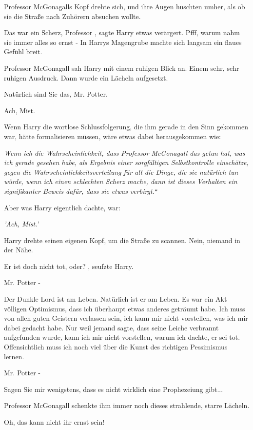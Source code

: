 Professor McGonagalls Kopf drehte sich, und ihre Augen huschten umher, als ob
sie die Straße nach Zuhörern absuchen wollte.

\glqq Das war ein Scherz, Professor\grqq{} , sagte Harry etwas verärgert. Pfff,
warum nahm sie immer alles so ernst - In Harrys Magengrube machte sich
langsam ein flaues Gefühl breit.

Professor McGonagall sah Harry mit einem ruhigen Blick an. Einem sehr, sehr
ruhigen Ausdruck. Dann wurde ein Lächeln aufgesetzt.

\glqq Natürlich sind Sie das, Mr. Potter.\grqq{}

Ach, Mist.

Wenn Harry die wortlose Schlussfolgerung, die ihm gerade in den Sinn gekommen
war, hätte formalisieren müssen, wäre etwas dabei herausgekommen wie:

\glqq \emph{Wenn ich die Wahrscheinlichkeit, dass Professor McGonagall das getan
hat, was ich gerade gesehen habe, als Ergebnis einer sorgfältigen
Selbstkontrolle einschätze, gegen die Wahrscheinlichkeitsverteilung für all
die Dinge, die sie natürlich tun würde, wenn ich einen schlechten Scherz
mache, dann ist dieses Verhalten ein signifikanter Beweis dafür, dass sie
etwas verbirgt.“ }

Aber was Harry eigentlich dachte, war:

\emph{'Ach, Mist.' }

Harry drehte seinen eigenen Kopf, um die Straße zu scannen. Nein, niemand in der
Nähe.

\glqq Er ist doch nicht tot, oder?\grqq{} , seufzte Harry.

\glqq Mr. Potter -\grqq{}

\glqq Der Dunkle Lord ist am Leben. Natürlich ist er am Leben. Es war ein Akt
völligen Optimismus, dass ich überhaupt etwas anderes geträumt habe. Ich
muss von allen guten Geistern verlassen sein, ich kann mir nicht vorstellen,
was ich mir dabei gedacht habe. Nur weil jemand sagte, dass seine Leiche
verbrannt aufgefunden wurde, kann ich mir nicht vorstellen, warum ich
dachte, er sei tot. Offensichtlich muss ich noch viel über die Kunst des
richtigen Pessimismus lernen.\grqq{}

\glqq Mr. Potter -\grqq{}

\glqq Sagen Sie mir wenigstens, dass es nicht wirklich eine Prophezeiung
gibt...\grqq{}

Professor McGonagall schenkte ihm immer noch dieses strahlende, starre Lächeln.

\glqq Oh, das kann nicht ihr ernst sein!\grqq{}

